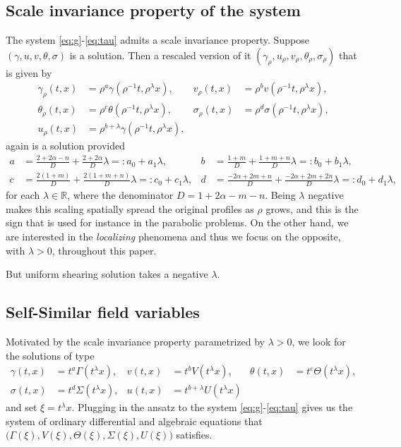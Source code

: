 \documentclass[a4paper,11pt]{article}
\begin{document}
\subsection{Scale invariance property of the system}
The system \eqref{eq:g}-\eqref{eq:tau} admits a scale invariance property. Suppose $(\gamma,u,v,\theta,\sigma)$ is a solution. Then a rescaled version of it $(\gamma_\rho,u_\rho,v_\rho,\theta_\rho,\sigma_\rho)$ that is given by
\begin{equation}\label{eq:scale}
\begin{aligned}
 \gamma_\rho(t,x) &= \rho^a\gamma(\rho^{-1}t,\rho^\lambda x), &
 v_\rho(t,x) &= \rho^bv(\rho^{-1}t,\rho^\lambda x),\\
 \theta_\rho(t,x) &= \rho^c\theta(\rho^{-1}t,\rho^\lambda x), &
 \sigma_\rho(t,x) &= \rho^d\sigma(\rho^{-1}t,\rho^\lambda x),\\
 u_\rho(t,x) &= \rho^{b+\lambda}\gamma(\rho^{-1}t,\rho^\lambda x),
\end{aligned}
\end{equation}
again is a solution provided
\begin{equation} \label{eq:exponents}
\begin{aligned}
 a&= \frac{2+2\alpha-n}{D} + \frac{2+2\alpha}{D}\lambda =: a_0 + a_1 \lambda, & b&=\frac{1+m}{D} + \frac{1+m+n}{D}\lambda =: b_0 + b_1\lambda,\\
 c&=\frac{2(1+m)}{D} + \frac{2(1+m+n)}{D}\lambda =: c_0 + c_1\lambda, & d&=\frac{-2\alpha + 2m +n}{D} + \frac{-2\alpha+2m+2n}{D}\lambda =: d_0 + d_1\lambda,
\end{aligned}
\end{equation}
for each $\lambda \in \mathbb{R}$, where the denominator $D = 1+2\alpha-m-n$. Being $\lambda$ negative makes this scaling spatially spread the original profiles  as $\rho$ grows, and this is the sign that is used for instance in the parabolic problems. On the other hand, we are interested in the {\it localizing} phenomena and thus we focus on the opposite, with $\lambda>0$, throughout this paper.

 But uniform shearing solution takes a negative $\lambda$.
\subsection{Self-Similar field variables}
Motivated by the scale invariance property parametrized by $\lambda>0$, we look for the solutions of type
\begin{equation}\label{eq:ORItoCAP}
\begin{aligned}
 \gamma(t,x) &= t^a\Gamma(t^\lambda x), & v(t,x) &= t^b V(t^\lambda x), &\theta(t,x) &= t^c \Theta(t^\lambda x),\\
 \sigma(t,x) &= t^d \Sigma(t^\lambda x), & u(t,x) &= t^{b+\lambda} U(t^\lambda x)
\end{aligned}
\end{equation}
and set $\xi = t^\lambda x$. Plugging in the ansatz to the system \eqref{eq:g}-\eqref{eq:tau} gives us the system of ordinary differential and algebraic equations that $\big(\Gamma(\xi), V(\xi), \Theta(\xi), \Sigma(\xi), U(\xi)\big)$ satisfies.
\end{document}
